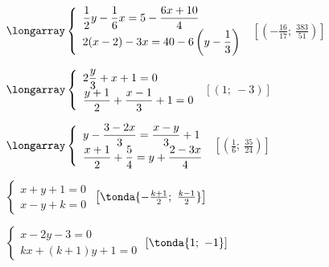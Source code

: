 \begin{esercizio}[\Ast]
\begin{multicols}{2}
\begin{enumeratea}
\item $\longarray\left\{\begin{array}{l}
\dfrac{1}{2}y-\dfrac{1}{6}x=5-\dfrac{6x+10}{4}\\
2(x-2)-3x=40-6\left(y-\dfrac{1}{3}\right)\end{array}\right.$
 \hfill $\left[\left(-\frac{16}{17};~\frac{383}{51}\right)\right]$
\item $\longarray\left\{\begin{array}{l}
2\dfrac{y}{3}+x+1=0\\
\dfrac{y+1}{2}+\dfrac{x-1}{3}+1=0\end{array}\right.$
 \hfill $\left[(1;~-3)\right]$
\item $\longarray\left\{\begin{array}{l}
y-\dfrac{3-2x}{3}=\dfrac{x-y}{3}+1\\
\dfrac{x+1}{2}+\dfrac{5}{4}=y+\dfrac{2-3x}{4}\end{array}\right.$
 \hfill $\left[\left(\frac{1}{6};~\frac{35}{24}\right)\right]$
  \item $\left\{\begin{array}{l}
  x+y+1=0 \\
  x-y+k=0 \end{array}\right.$
 \hfill $\left[\tonda{-\frac{k+1}{2};~\frac{k-1}{2}}\right]$
\item $\left\{\begin{array}{l}
x-2y-3=0\\
kx+(k+1)y+1=0 \end{array}\right.$
 \hfill $\left[\tonda{1;~-1}\right]$
 \end{enumeratea}
 \end{multicols}
\end{esercizio}



